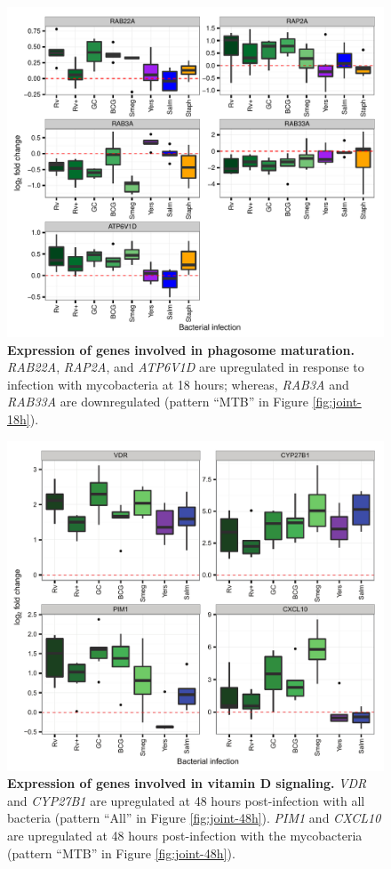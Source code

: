 \begin{figure}[htbp]
\centering
\includegraphics[width=5in]{img/ch02/fig-S04-phago.pdf}
\caption[Expression of genes involved in phagosome
  maturation.]{\textbf{Expression of genes involved in phagosome
    maturation.} \emph{RAB22A}, \emph{RAP2A}, and \emph{ATP6V1D} are
  upregulated in response to infection with mycobacteria at 18 hours;
  whereas, \emph{RAB3A} and \emph{RAB33A} are downregulated (pattern
  ``MTB'' in Figure \ref{fig:joint-18h}).}
\label{fig:phago}
\end{figure}

\begin{figure}[htbp]
\centering
\includegraphics[width=5in]{img/ch02/fig-S05-vitD.pdf}
\caption[Expression of genes involved in vitamin D
  signaling.]{\textbf{Expression of genes involved in vitamin D
    signaling.}  \emph{VDR} and \emph{CYP27B1} are upregulated at 48
  hours post-infection with all bacteria (pattern ``All'' in Figure
  \ref{fig:joint-48h}). \emph{PIM1} and \emph{CXCL10} are upregulated
  at 48 hours post-infection with the mycobacteria (pattern ``MTB'' in
  Figure \ref{fig:joint-48h}).}
\label{fig:vitD}
\end{figure}

